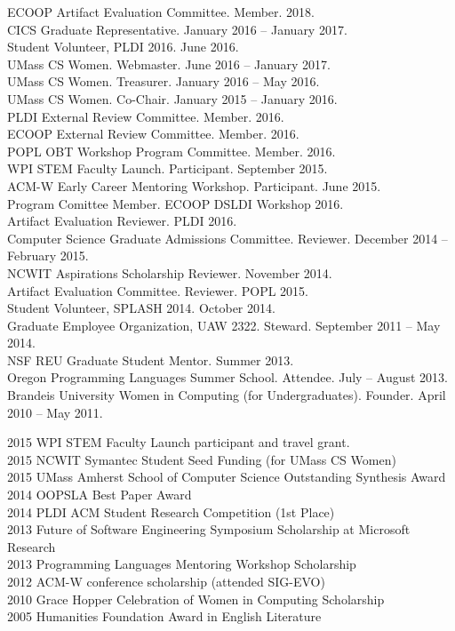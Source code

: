 \documentclass[10pt]{article}
\newcommand{\cvsec}[2]{
    \begin{tcolorbox}[width=\textwidth, breakable, title={#1}]
        #2
    \end{tcolorbox}
    \vspace{10pt}
}
\begin{document}
\cvsec{Professional Activities and Service}{
  ECOOP Artifact Evaluation Committee. Member. 2018.\\
  CICS Graduate Representative. January 2016 -- January 2017.\\
  Student Volunteer, PLDI 2016. June 2016. \\
  UMass CS Women. Webmaster. June 2016 -- January 2017.\\
  UMass CS Women. Treasurer. January 2016 -- May 2016.\\
  UMass CS Women. Co-Chair. January 2015 -- January 2016.\\
  PLDI External Review Committee.  Member.  2016.\\
  ECOOP External Review Committee.  Member.  2016.\\
  POPL OBT Workshop Program Committee.  Member.  2016.\\
  WPI STEM Faculty Launch.  Participant.  September 2015.\\
  ACM-W Early Career Mentoring Workshop.  Participant.  June 2015.\\
  Program Comittee Member. ECOOP DSLDI Workshop 2016. \\
  Artifact Evaluation Reviewer. PLDI 2016. \\
  Computer Science Graduate Admissions Committee. Reviewer. December 2014 -- February 2015.\\
  NCWIT Aspirations Scholarship Reviewer. November 2014. \\
  Artifact Evaluation Committee. Reviewer. POPL 2015.\\
  Student Volunteer, SPLASH 2014. October 2014.\\
  Graduate Employee Organization, UAW 2322. Steward. September 2011 -- May 2014.\\
  NSF REU Graduate Student Mentor. Summer 2013.\\
  Oregon Programming Languages Summer School. Attendee. July -- August 2013.	\\
  Brandeis University Women in Computing (for Undergraduates). Founder. April 2010 -- May 2011. 
}


\cvsec{Honors, Scholarships, and Awards}{
  2015 WPI STEM Faculty Launch participant and travel grant.\\
  2015 NCWIT Symantec Student Seed Funding (for UMass CS Women)\\
  2015 UMass Amherst School of Computer Science Outstanding Synthesis Award\\
  2014 OOPSLA Best Paper Award\\
  2014 PLDI ACM Student Research Competition (1st Place)\\
  2013 Future of Software Engineering Symposium Scholarship at Microsoft Research\\
  2013 Programming Languages Mentoring Workshop Scholarship\\
  2012 ACM-W conference scholarship (attended SIG-EVO)\\
  2010 Grace Hopper Celebration of Women in Computing Scholarship\\
  2005 Humanities Foundation Award in English Literature\\
}
\end{document}
